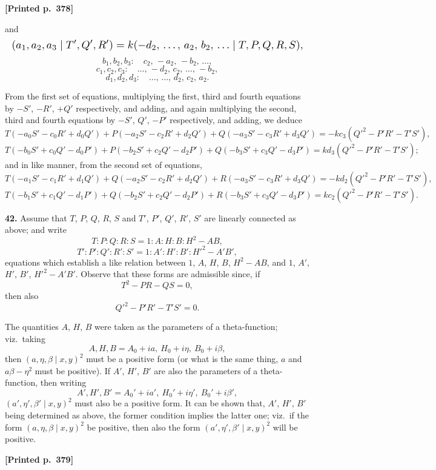 \documentclass[11pt]{article}
\begin{document}
\medskip
\noindent\textbf{[Printed p.~378]}\hfill

\medskip
and
\[
\resizebox{\textwidth}{!}{$\displaystyle
(a_{1},a_{2},a_{3}\mid T',Q',R')=k(-d_{2},\,\ldots,\,a_{2},\,b_{2},\,\ldots\mid T,P,Q,R,S),
$}
\]
\[
b_{1},b_{2},b_{3}:\quad c_{2},\,-a_{2},\,-b_{2},\,\ldots,
\]
\[
c_{1},c_{2},c_{3}:\quad \ldots,\,-d_{2},\,c_{2},\,\ldots,\,-b_{2},
\]
\[
d_{1},d_{2},d_{3}:\quad \ldots,\,\ldots,\,d_{2},\,c_{2},\,a_{2}.
\]

From the first set of equations, multiplying the first, third and fourth equations by $-S'$, $-R'$, $+Q'$ respectively, and adding, and again multiplying the second, third and fourth equations by $-S'$, $Q'$, $-P'$ respectively, and adding, we deduce
\[
T(-a_{0}S'-c_{0}R'+d_{0}Q')+P(-a_{2}S'-c_{2}R'+d_{2}Q')+Q(-a_{3}S'-c_{3}R'+d_{3}Q')=-kc_{3}(Q'^{2}-P'R'-T'S'),
\]
\[
T(-b_{0}S'+c_{0}Q'-d_{0}P')+P(-b_{2}S'+c_{2}Q'-d_{2}P')+Q(-b_{3}S'+c_{3}Q'-d_{3}P')=kd_{3}(Q'^{2}-P'R'-T'S');
\]
and in like manner, from the second set of equations,
\[
T(-a_{1}S'-c_{1}R'+d_{1}Q')+Q(-a_{2}S'-c_{2}R'+d_{2}Q')+R(-a_{3}S'-c_{3}R'+d_{3}Q')=-kd_{2}(Q'^{2}-P'R'-T'S'),
\]
\[
T(-b_{1}S'+c_{1}Q'-d_{1}P')+Q(-b_{2}S'+c_{2}Q'-d_{2}P')+R(-b_{3}S'+c_{3}Q'-d_{3}P')=kc_{2}(Q'^{2}-P'R'-T'S').
\]

\medskip
\noindent\textbf{42.} Assume that $T$, $P$, $Q$, $R$, $S$ and $T'$, $P'$, $Q'$, $R'$, $S'$ are linearly connected as above; and write
\[
T:P:Q:R:S=1:A:H:B:H^{2}-AB,
\]
\[
T':P':Q':R':S'=1:A':H':B':H'^{2}-A'B',
\]
equations which establish a like relation between $1$, $A$, $H$, $B$, $H^{2}-AB$, and $1$, $A'$, $H'$, $B'$, $H'^{2}-A'B'$. Observe that these forms are admissible since, if
\[
T^{2}-PR-QS=0,
\]
then also
\[
Q'^{2}-P'R'-T'S'=0.
\]

The quantities $A$, $H$, $B$ were taken as the parameters of a theta-function; viz.\ taking
\[
A,H,B=A_{0}+ia,\ H_{0}+i\eta,\ B_{0}+i\beta,
\]
then $(a,\eta,\beta \mid x,y)^{2}$ must be a positive form (or what is the same thing, $a$ and $a\beta-\eta^{2}$ must be positive). If $A'$, $H'$, $B'$ are also the parameters of a theta-function, then writing
\[
A',H',B'=A_{0}'+ia',\ H_{0}'+i\eta',\ B_{0}'+i\beta',
\]
$(a',\eta',\beta' \mid x,y)^{2}$ must also be a positive form. It can be shown that, $A'$, $H'$, $B'$ being determined as above, the former condition implies the latter one; viz.\ if the form $(a,\eta,\beta \mid x,y)^{2}$ be positive, then also the form $(a',\eta',\beta' \mid x,y)^{2}$ will be positive.

\medskip
\noindent\textbf{[Printed p.~379]}\hfill
\end{document}
